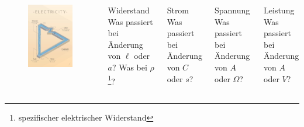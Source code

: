 \begin{frame}
  \begin{columns}
    \begin{center}
      \begin{figure}
        \includegraphics[width=\textwidth,height=.8\textheight,keepaspectratio]{e03/electricity.jpg}\\
      \end{figure}
    \end{center}
    \pause
    \begin{exampleblock}{Widerstand}
      Was passiert bei Änderung von $\ell$ oder $a$? Was bei $\rho$\footnote{\tiny spezifischer elektrischer Widerstand}?
    \end{exampleblock}
    \pause
    \begin{exampleblock}{Strom}
      Was passiert bei Änderung von $C$ oder $s$?
    \end{exampleblock}
    \pause
    \begin{exampleblock}{Spannung}
      Was passiert bei Änderung von $A$ oder $\Omega$?
    \end{exampleblock}
    \pause
    \begin{exampleblock}{Leistung}
      Was passiert bei Änderung von $A$ oder $V$?
    \end{exampleblock}
  \end{columns}
\end{frame}

